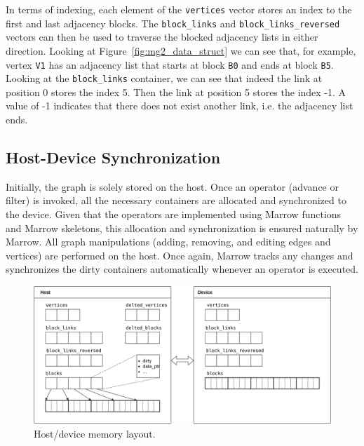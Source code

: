 In terms of indexing, each element of the \texttt{vertices} vector stores an index to the first and last adjacency blocks. The \texttt{block\_links} and \texttt{block\_links\_reversed} vectors can then be used to traverse the blocked adjacency lists in either direction. Looking at Figure~\ref{fig:mg2_data_struct} we can see that, for example, vertex \texttt{V1} has an adjacency list that starts at block \texttt{B0} and ends at block \texttt{B5}. Looking at the \texttt{block\_links} container, we can see that indeed the link at position 0 stores the index 5. Then the link at position 5 stores the index -1. A value of -1 indicates that there does not exist another link, i.e. the adjacency list ends.

\subsection{Host-Device Synchronization}
\label{sec:host_dev_sync}

Initially, the graph is solely stored on the host. Once an operator (advance or filter) is invoked, all the necessary containers are allocated and synchronized to the device. Given that the operators are implemented using Marrow functions and Marrow skeletons, this allocation and synchronization is ensured naturally by Marrow. All graph manipulations (adding, removing, and editing edges and vertices) are performed on the host. Once again, Marrow tracks any changes and synchronizes the dirty containers automatically whenever an operator is executed.


\begin{figure}
  \centering
    \includegraphics[width=\textwidth]{Chapters/Figures/Images/host_device_memory.png}
    \caption{Host/device memory layout.}
\label{fig:host_device_memory}
\end{figure}


